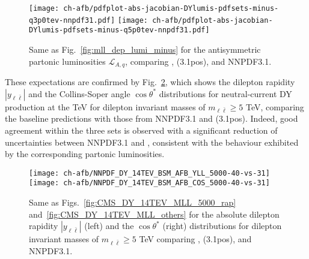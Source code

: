 \begin{figure}[!t]
 \centering
 \texttt{[image: ch-afb/pdfplot-abs-jacobian-DYlumis-pdfsets-minus-q3p0tev-nnpdf31.pdf]}
 \texttt{[image: ch-afb/pdfplot-abs-jacobian-DYlumis-pdfsets-minus-q5p0tev-nnpdf31.pdf]}
 \caption{Same as Fig.~\ref{fig:mll_dep_lumi_minus} for the antisymmetric partonic luminosities $\mathcal{L}_{A,q}$,
   comparing , (3.1pos), and NNPDF3.1.
 }    
 \label{fig:pdfplot-absDYlumis-pdfsets-minus-q5tev-nnpdf31}
\end{figure}

These expectations are confirmed by
Fig.~\ref{fig:CMS_DY_14TEV_COSTH_5000_YLL40-vs-31}, which shows the
dilepton rapidity $|y_{\ell\bar{\ell}}|$ 
and the Collins-Soper angle $\cos\theta^*$ distributions for neutral-current DY production
at the  TeV for dilepton invariant masses of $m_{\ell\bar{\ell}}\ge 5$ TeV,
comparing the baseline  predictions with those from NNPDF3.1
and (3.1pos).
%
Indeed, 
good agreement within the three \pdf sets is observed with a significant reduction
of \pdf uncertainties between NNPDF3.1 and , consistent
with the behaviour exhibited by the corresponding partonic luminosities.

\begin{figure}[!t]
 \centering
 \texttt{[image: ch-afb/NNPDF\_DY\_14TEV\_BSM\_AFB\_YLL\_5000-40-vs-31]}
 \texttt{[image: ch-afb/NNPDF\_DY\_14TEV\_BSM\_AFB\_COS\_5000-40-vs-31]}
 \caption{Same as Figs.~\ref{fig:CMS_DY_14TEV_MLL_5000_rap}
and~\ref{fig:CMS_DY_14TEV_MLL_others}
for the absolute dilepton rapidity $|y_{\ell\bar{\ell}}|$ (left)
and the $\cos \theta^*$  (right) distributions
for dilepton invariant masses of $m_{\ell\bar{\ell}}\ge 5$ TeV
 comparing
, (3.1pos), and NNPDF3.1.
 }    
 \label{fig:CMS_DY_14TEV_COSTH_5000_YLL40-vs-31}
\end{figure}
